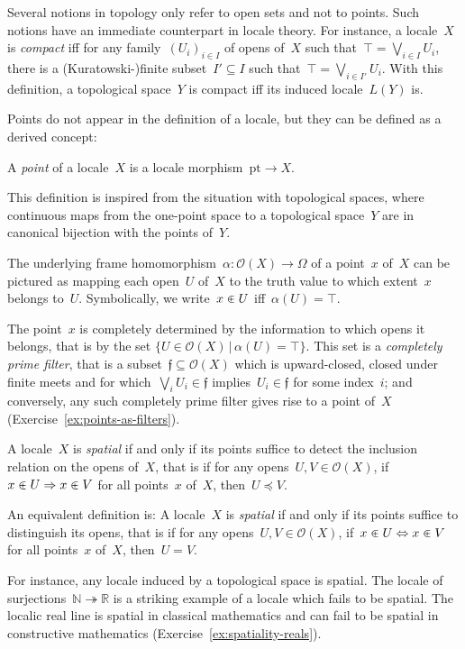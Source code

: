 \documentclass{ws-rv9x6}
\renewcommand{\O}{\mathcal{O}}
\newcommand{\NN}{\mathbb{N}}
\newcommand{\RR}{\mathbb{R}}
\newcommand{\fff}{\mathfrak{f}}
\renewcommand{\_}{\mathpunct{.}}
\newcommand{\?}{\,{:}\,}
\newcommand{\pt}{\mathrm{pt}}
\begin{document}
Several notions in topology only refer to open sets and not to points. Such
notions have an immediate counterpart in locale theory. For instance, a
locale~$X$ is \emph{compact} iff for any family~$(U_i)_{i \in I}$ of opens
of~$X$ such that~$\top = \bigvee_{i \in I} U_i$, there is a (Kuratowski-)finite
subset~$I' \subseteq I$ such that~$\top = \bigvee_{i \in I'} U_i$.
With this definition, a topological space~$Y$ is compact iff its induced locale~$L(Y)$ is.

Points do not appear in the definition of a locale, but they can be defined as
a derived concept:
\begin{definition}A \emph{point} of a locale~$X$ is a locale morphism~$\pt \to
X$.\end{definition}

This definition is inspired from the situation with topological spaces, where
continuous maps from the one-point space to a topological space~$Y$ are in
canonical bijection with the points of~$Y$.

The underlying frame homomorphism~$\alpha : \O(X) \to \Omega$ of a point~$x$
of~$X$ can be pictured as mapping each open~$U$ of~$X$ to the truth value to which
extent~$x$ belongs to~$U$. Symbolically, we write~$x \inplus U$ iff~$\alpha(U)
= \top$.

The point~$x$ is completely determined by the information to which opens it
belongs, that is by the set {$\{ U \in \O(X) \,|\, \alpha(U) = \top \}$}. This set is a \emph{completely
prime filter}, that is a subset~$\fff \subseteq \O(X)$ which is upward-closed,
closed under finite meets and for which~$\bigvee_i U_i \in \fff$ implies~$U_i
\in \fff$ for some index~$i$; and conversely, any such completely prime filter
gives rise to a point of~$X$ (Exercise~\ref{ex:points-as-filters}).

\begin{definition}A locale~$X$ is \emph{spatial} if and only if its points
suffice to detect the inclusion relation on the opens of~$X$, that is if for any opens~$U, V \in \O(X)$,
if~$x \inplus U \Rightarrow x \inplus V$ for all points~$x$ of~$X$, then~$U
\preceq V$.\end{definition}

An equivalent definition is: A locale~$X$ is \emph{spatial} if and only if its points
suffice to distinguish its opens, that is if for any opens~$U, V \in \O(X)$, if~$x \inplus U
\Leftrightarrow x \inplus V$ for all points~$x$ of~$X$, then~$U = V$.

For instance, any locale induced by a topological space is spatial. The locale
of surjections~$\NN \twoheadrightarrow \RR$ is a striking example of a locale which fails to be
spatial. The localic real line is spatial in classical mathematics and can
fail to be spatial in constructive mathematics (Exercise~\ref{ex:spatiality-reals}).
\end{document}
